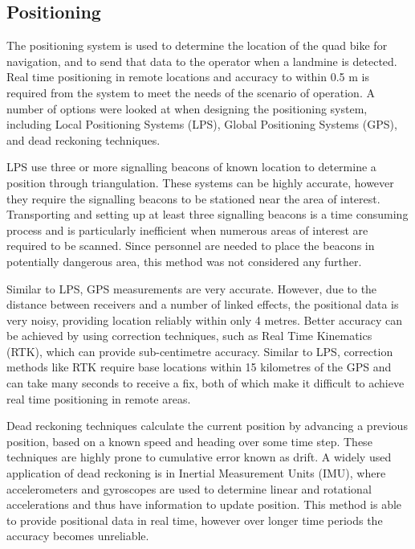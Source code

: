 \documentclass[main.tex]{subfiles}
\begin{document}
\subsection{Positioning}
The positioning system is used to determine the location of the quad bike for navigation, and to send that data to the operator when a landmine is detected. Real time positioning in remote locations and accuracy to within 0.5 m is required from the system to meet the needs of the scenario of operation. A number of options were looked at when designing the positioning system, including Local Positioning Systems (LPS), Global Positioning Systems (GPS), and dead reckoning techniques.
%
%

LPS use three or more signalling beacons of known location to determine a position through triangulation. These systems can be highly accurate, however they require the signalling beacons to be stationed near the area of interest. Transporting and setting up at least three signalling beacons is a time consuming process and is particularly inefficient when numerous areas of interest are required to be scanned. Since personnel are needed to place the beacons in potentially dangerous area, this method was not considered any further. 

Similar to LPS, GPS measurements are very accurate. However, due to the distance between receivers and a number of linked effects, the positional data is very noisy, providing location reliably within only 4 metres. Better accuracy can be achieved by using correction techniques, such as Real Time Kinematics (RTK), which can provide sub-centimetre accuracy. Similar to LPS, correction methods like RTK require base locations within 15 kilometres of the GPS and can take many seconds to receive a fix, both of which make it difficult to achieve real time positioning in remote areas.
%

Dead reckoning techniques calculate the current position by advancing a previous position, based on a known speed and heading over some time step. These techniques are highly prone to cumulative error known as drift. A widely used application of dead reckoning is in Inertial Measurement Units (IMU), where accelerometers and gyroscopes are used to determine linear and rotational accelerations and thus have information to update position. This method is able to provide positional data in real time, however over longer time periods the accuracy becomes unreliable.
%
\end{document}
